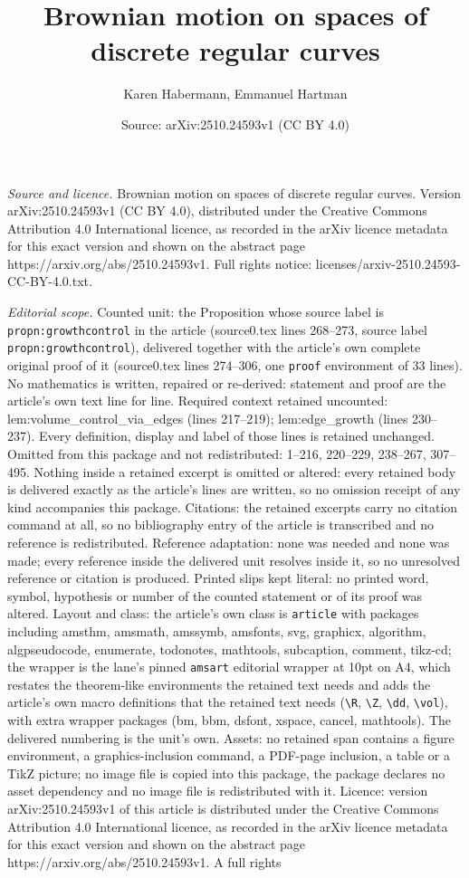 \documentclass[10pt,a4paper]{amsart}
\title[Brownian motion on spaces of discrete regular curves]{Brownian motion on spaces of discrete regular curves}
\author{Karen Habermann, Emmanuel Hartman}
\date{Source: arXiv:2510.24593v1 (CC BY 4.0)}
\begin{document}
\maketitle

\noindent\emph{Source and licence.} Brownian motion on spaces of discrete regular curves. Version arXiv:2510.24593v1 (CC BY 4.0), distributed under the Creative Commons Attribution 4.0 International licence, as recorded in the arXiv licence metadata for this exact version and shown on the abstract page https://arxiv.org/abs/2510.24593v1. Full rights notice: licenses/arxiv-2510.24593-CC-BY-4.0.txt.\par\smallskip

\noindent\textit{Editorial scope.} Counted unit: the Proposition whose source label is \texttt{propn:growthcontrol} in the article (source0.tex lines 268--273, source label \texttt{propn:growthcontrol}), delivered together with the article's own complete original proof of it (source0.tex lines 274--306, one \texttt{proof} environment of 33 lines). No mathematics is written, repaired or re-derived: statement and proof are the article's own text line for line. Required context retained uncounted: lem:volume\_control\_via\_edges (lines 217--219); lem:edge\_growth (lines 230--237). Every definition, display and label of those lines is retained unchanged. Omitted from this package and not redistributed: 1--216, 220--229, 238--267, 307--495. Nothing inside a retained excerpt is omitted or altered: every retained body is delivered exactly as the article's lines are written, so no omission receipt of any kind accompanies this package. Citations: the retained excerpts carry no citation command at all, so no bibliography entry of the article is transcribed and no reference is redistributed. Reference adaptation: none was needed and none was made; every reference inside the delivered unit resolves inside it, so no unresolved reference or citation is produced. Printed slips kept literal: no printed word, symbol, hypothesis or number of the counted statement or of its proof was altered. Layout and class: the article's own class is \texttt{article} with packages including amsthm, amsmath, amssymb, amsfonts, svg, graphicx, algorithm, algpseudocode, enumerate, todonotes, mathtools, subcaption, comment, tikz-cd; the wrapper is the lane's pinned \texttt{amsart} editorial wrapper at 10pt on A4, which restates the theorem-like environments the retained text needs and adds the article's own macro definitions that the retained text needs (\texttt{\textbackslash R}, \texttt{\textbackslash Z}, \texttt{\textbackslash dd}, \texttt{\textbackslash vol}), with extra wrapper packages (bm, bbm, dsfont, xspace, cancel, mathtools). The delivered numbering is the unit's own. Assets: no retained span contains a figure environment, a graphics-inclusion command, a PDF-page inclusion, a table or a TikZ picture; no image file is copied into this package, the package declares no asset dependency and no image file is redistributed with it. Licence: version arXiv:2510.24593v1 of this article is distributed under the Creative Commons Attribution 4.0 International licence, as recorded in the arXiv licence metadata for this exact version and shown on the abstract page https://arxiv.org/abs/2510.24593v1. A full rights 
\end{document}
